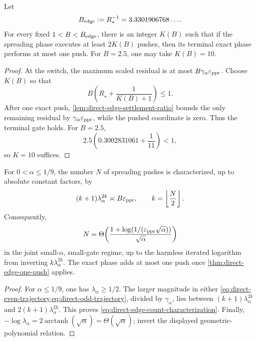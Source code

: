 \begin{theorem}
\label{thm:direct-edge-one-push}
Let
\begin{equation}
 B_{\rm edge}:=R_\star^{-1}=3.3301906768\ldots.
 \label{eq:direct-edge-band-ceiling}
\end{equation}
For every fixed $1<B<B_{\rm edge}$, there is an integer $K(B)$ such that if
the spreading phase executes at least $2K(B)$ pushes, then its terminal exact
phase performs at most one push. For $B=2.5$, one may take $K(B)=10$.
\end{theorem}

\begin{proof}
At the switch, the maximum scaled residual is at most
$B\gamma_\alpha\varepsilon_{\mathrm{ppr}}$. Choose $K(B)$ so that
\begin{equation*}
 B\left(R_\star+\frac1{K(B)+1}\right)\leq1.
\end{equation*}
After one exact push, \cref{lem:direct-edge-settlement-ratio} bounds the only
remaining residual by $\gamma_\alpha\varepsilon_{\mathrm{ppr}}$, while the pushed coordinate is
zero. Thus the terminal gate holds. For $B=2.5$,
\begin{equation*}
 2.5\left(0.3002831061+\frac1{11}\right)<1,
\end{equation*}
so $K=10$ suffices.
\end{proof}

\begin{corollary}
\label{cor:direct-edge-work}
For $0<\alpha\leq1/9$, the number $N$ of spreading pushes is characterized,
up to absolute constant factors, by
\begin{equation}
 (k+1)\lambda_\alpha^{2k}\asymp B\varepsilon_{\mathrm{ppr}},
 \qquad k=\left\lfloor\frac N2\right\rfloor.
 \label{eq:direct-edge-count-characterization}
\end{equation}
Consequently,
\begin{equation}
 N
 =\Theta\!\left(
   \frac{1+\log(1/(\varepsilon_{\mathrm{ppr}}\sqrt\alpha))}{\sqrt\alpha}
  \right)
 \label{eq:direct-edge-accelerated-count}
\end{equation}
in the joint small-$\alpha$, small-gate regime, up to the harmless iterated
logarithm from inverting $k\lambda_\alpha^{2k}$. The exact phase adds at most
one push once \cref{thm:direct-edge-one-push} applies.
\end{corollary}

\begin{proof}
For $\alpha\leq1/9$, one has $\lambda_\alpha\geq1/2$. The larger magnitude
in either \cref{eq:direct-even-trajectory,eq:direct-odd-trajectory}, divided
by $\gamma_\alpha$, lies between
$(k+1)\lambda_\alpha^{2k}$ and
$2(k+1)\lambda_\alpha^{2k}$. This proves
\cref{eq:direct-edge-count-characterization}. Finally,
$-\log\lambda_\alpha=2\operatorname{arctanh}(\sqrt\alpha)
=\Theta(\sqrt\alpha)$; invert the displayed geometric-polynomial relation.
\end{proof}

